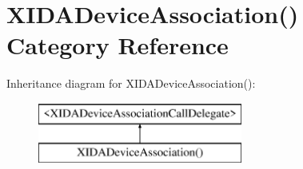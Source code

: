 \hypertarget{category_x_i_d_a_device_association_07_08}{}\section{X\+I\+D\+A\+Device\+Association() Category Reference}
\label{category_x_i_d_a_device_association_07_08}
Inheritance diagram for X\+I\+D\+A\+Device\+Association()\+:\begin{figure}[H]
\begin{center}
\leavevmode
\includegraphics[height=2.000000cm]{category_x_i_d_a_device_association_07_08}
\end{center}
\end{figure}
